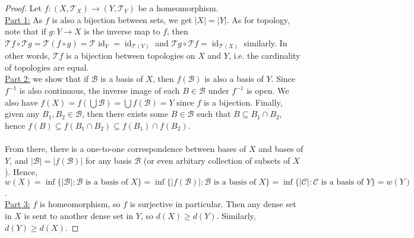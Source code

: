 \documentclass{treatise}
\begin{document}
\begin{proof} Let $f: (X, \mathcal{T}_X) \to (Y, \mathcal{T}_Y)$ be a homeomorphism.
\\
\underline{Part 1:} As $f$ is also a bijection between sets, we get $|X| = |Y|$. As for topology, note that if $g: Y \to X$ is the inverse map to $f$, then $\mathcal{T}f \circ \mathcal{T} g = \mathcal{T}(f \circ g) = \mathcal{T}\operatorname{id}_Y = \operatorname{id}_{\mathcal{T}(Y)}$ and $\mathcal{T}g \circ \mathcal{T}f = \operatorname{id}_{\mathcal{T}(X)}$ similarly. In other words, $\mathcal{T}f$ is a bijection between topologies on $X$ and $Y$, i.e. the cardinality of topologies are equal.
\\
\underline{Part 2:} we show that if $\mathcal{B}$ is a basis of $X$, then $f(\mathcal{B})$ is also a basis of $Y$. Since $f^{-1}$ is also continuous, the inverse image of each $B \in \mathcal{B}$ under $f^{-1}$ is open. We also have $f(X) = f \left( \bigcup \mathcal{B} \right) = \bigcup f(\mathcal{B}) = Y$ since $f$ is a bijection. Finally, given any $B_1, B_2 \in \mathcal{B}$, then there exists some $B \in \mathcal{B}$ such that $B \subseteq B_1 \cap B_2$, hence $f(B) \subseteq f(B_1 \cap B_2) \subseteq f(B_1) \cap f(B_2)$.
\\
\\
From there, there is a one-to-one correspondence between bases of $X$ and bases of $Y$, and $|\mathcal{B}| = |f(\mathcal{B})|$ for any basis $\mathcal{B}$ (or even arbitary collection of subsets of $X$). Hence, $w(X) = \inf \{ |\mathcal{B}| : \mathcal{B} \mbox{ is a basis of } X \} = \inf \{ |f(\mathcal{B})| : \mathcal{B} \mbox{ is a basis of } X \} = \inf \{ |\mathcal{C}| : \mathcal{C} \mbox{ is a basis of } Y \} = w(Y)$.
\\
\underline{Part 3:} $f$ is homeomorphism, so $f$ is surjective in particular. Then any dense set in $X$ is sent to another dense set in $Y$, so $d(X) \geq d(Y)$. Similarly, $d(Y) \geq d(X)$.
\end{proof}
\end{document}
